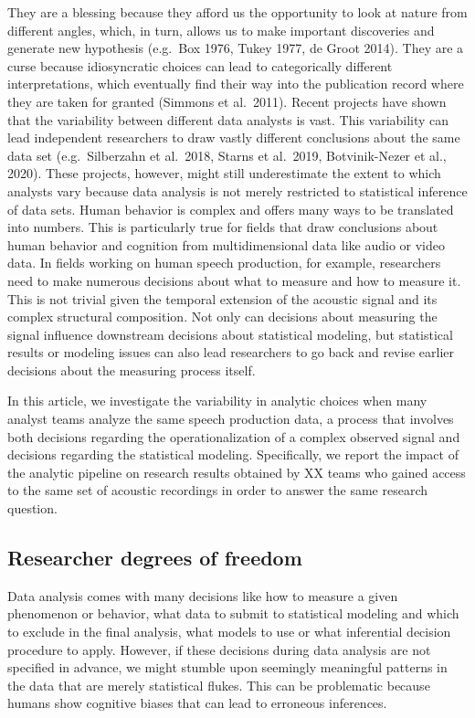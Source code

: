 \documentclass[
  english,
  man]{apa6}
\begin{document}
They are a blessing because they afford us the opportunity to look at nature from different angles, which, in turn, allows us to make important discoveries and generate new hypothesis (e.g.~Box 1976, Tukey 1977, de Groot 2014).
They are a curse because idiosyncratic choices can lead to categorically different interpretations, which eventually find their way into the publication record where they are taken for granted (Simmons et al.~2011).
Recent projects have shown that the variability between different data analysts is vast.
This variability can lead independent researchers to draw vastly different conclusions about the same data set (e.g.~Silberzahn et al.~2018, Starns et al.~2019, Botvinik-Nezer et al., 2020).
These projects, however, might still underestimate the extent to which analysts vary because data analysis is not merely restricted to statistical inference of data sets.
Human behavior is complex and offers many ways to be translated into numbers.
This is particularly true for fields that draw conclusions about human behavior and cognition from multidimensional data like audio or video data.
In fields working on human speech production, for example, researchers need to make numerous decisions about what to measure and how to measure it.
This is not trivial given the temporal extension of the acoustic signal and its complex structural composition.
Not only can decisions about measuring the signal influence downstream decisions about statistical modeling, but statistical results or modeling issues can also lead researchers to go back and revise earlier decisions about the measuring process itself.

In this article, we investigate the variability in analytic choices when many analyst teams analyze the same speech production data, a process that involves both decisions regarding the operationalization of a complex observed signal and decisions regarding the statistical modeling.
Specifically, we report the impact of the analytic pipeline on research results obtained by XX teams who gained access to the same set of acoustic recordings in order to answer the same research question.

\hypertarget{researcher-degrees-of-freedom}{%
\subsection{Researcher degrees of freedom}\label{researcher-degrees-of-freedom}}

Data analysis comes with many decisions like how to measure a given phenomenon or behavior, what data to submit to statistical modeling and which to exclude in the final analysis, what models to use or what inferential decision procedure to apply.
However, if these decisions during data analysis are not specified in advance, we might stumble upon seemingly meaningful patterns in the data that are merely statistical flukes.
This can be problematic because humans show cognitive biases that can lead to erroneous inferences.
\end{document}
